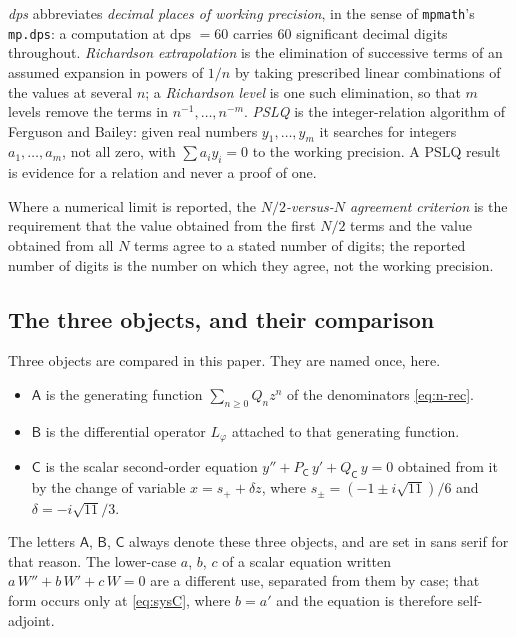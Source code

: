 \emph{dps} abbreviates \emph{decimal places of working precision}, in the sense
of \texttt{mpmath}'s \texttt{mp.dps}: a computation at dps $=60$ carries $60$
significant decimal digits throughout. \emph{Richardson extrapolation} is the
elimination of successive terms of an assumed expansion in powers of $1/n$ by
taking prescribed linear combinations of the values at several $n$; a
\emph{Richardson level} is one such elimination, so that $m$ levels remove the
terms in $n^{-1},\dots,n^{-m}$. \emph{PSLQ} is the integer-relation algorithm
of Ferguson and Bailey: given real numbers $y_1,\dots,y_m$ it searches for
integers $a_1,\dots,a_m$, not all zero, with $\sum a_i y_i=0$ to the working
precision. A PSLQ result is evidence for a relation and never a proof of one.

Where a numerical limit is reported, the \emph{$N/2$-versus-$N$ agreement
criterion} is the requirement that the value obtained from the first $N/2$
terms and the value obtained from all $N$ terms agree to a stated number of
digits; the reported number of digits is the number on which they agree, not
the working precision.

\subsection{The three objects, and their comparison}\label{ssec:objects}

Three objects are compared in this paper. They are named once, here.

\begin{itemize}
\item \textbf{$\mathsf A$} is the generating function $\sum_{n\ge0}Q_nz^n$ of
  the denominators \eqref{eq:n-rec}.
\item \textbf{$\mathsf B$} is the differential operator $L_\varphi$ attached to
  that generating function.
\item \textbf{$\mathsf C$} is the scalar second-order equation
  $y''+P_{\mathsf C}\,y'+Q_{\mathsf C}\,y=0$ obtained from it by the change of
  variable $x=s_++\delta z$, where $s_\pm=(-1\pm i\sqrt{11})/6$ and
  $\delta=-i\sqrt{11}/3$.
\end{itemize}

The letters $\mathsf A$, $\mathsf B$, $\mathsf C$ always denote these three
objects, and are set in sans serif for that reason. The lower-case $a$, $b$,
$c$ of a scalar equation written $a\,W''+b\,W'+c\,W=0$ are a different use,
separated from them by case; that form occurs only at \eqref{eq:sysC}, where
$b=a'$ and the equation is therefore self-adjoint.

